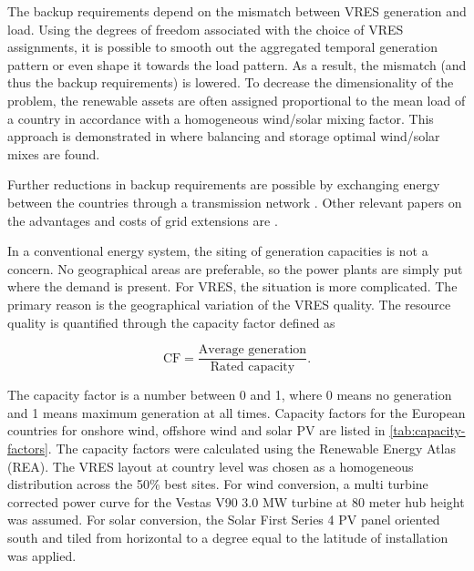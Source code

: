 \documentclass[a4paper, 5p, sort&compress]{elsarticle}%
\begin{document}
The backup requirements depend on the mismatch between VRES generation
and load. Using the degrees of freedom associated with the choice of
VRES assignments, it is possible to smooth out the aggregated temporal
generation pattern or even shape it towards the load pattern. As a
result, the mismatch (and thus the backup requirements) is lowered.
To decrease the dimensionality of the problem, the renewable assets
are often assigned proportional to the mean load of a country in
accordance with a homogeneous wind/solar mixing factor. This approach
is demonstrated in \cite{Heide2010,Heide2011} where balancing and
storage optimal wind/solar mixes are found.

Further reductions in backup requirements are possible by exchanging
energy between the countries through a transmission network
\cite{rolando2014,sarah}. Other relevant papers on the advantages and
costs of grid extensions are \cite{Schaber, Schaber2}.


In a conventional energy system, the siting of generation capacities
is not a concern. No geographical areas are preferable, so the power
plants are simply put where the demand is present. For VRES, the
situation is more complicated. The primary reason is the geographical
variation of the VRES
quality. %
The resource quality is quantified through the capacity factor defined as

\begin{equation}
  \label{eq:1}
  \mbox{CF} = \frac{\mbox{Average generation}}{\mbox{Rated capacity}} .
\end{equation}

The capacity factor is a number between 0 and 1, where 0 means no
generation and 1 means maximum generation at all times. Capacity
factors for the European countries for onshore wind, offshore wind and
solar PV are listed in \cref{tab:capacity-factors}. The capacity
factors were calculated using the Renewable Energy Atlas \cite{REA}
(REA). The VRES layout at country level was chosen as a homogeneous
distribution across the 50\% best sites. For wind conversion, a multi
turbine corrected power curve for the Vestas V90 3.0 MW turbine at 80
meter hub height was assumed. For solar conversion, the Solar First
Series 4 PV panel oriented south and tiled from horizontal to a
degree equal to the latitude of installation was applied.
\end{document}
